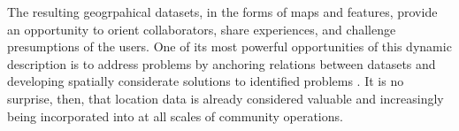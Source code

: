 The resulting geogrpahical datasets, in the forms of maps and features, provide an opportunity to orient collaborators, share experiences, and challenge presumptions of the users\cite{Jiang2020, McQueenBaker2019}.%
One of its most powerful opportunities of this dynamic description is to address problems by anchoring relations between datasets and developing spatially considerate solutions to identified problems \cite{Bhattacharya2018, Rajabifard2009}. %
It is no surprise, then, that location data is already considered valuable and increasingly being incorporated into at all scales of community operations\cite{Bhattacharya2018, Roche2012}. %
